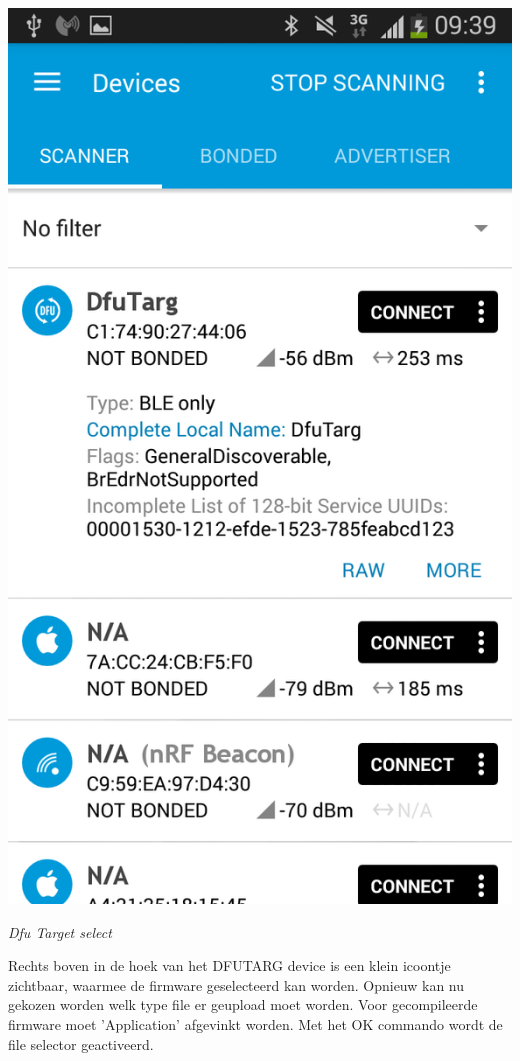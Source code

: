 \documentclass[conference]{IEEEtran}
\begin{document}
\begin{center}
    \includegraphics[scale=0.3]{FOTA4}
    \begin{minipage}{0.6\textwidth}
    \footnotesize
    \emph{Dfu Target select}
    \end{minipage}
\end{center}

Rechts boven in de hoek van het DFUTARG device is een klein icoontje zichtbaar, waarmee de firmware geselecteerd kan worden. Opnieuw kan nu gekozen worden welk type file er geupload moet worden. Voor gecompileerde firmware moet 'Application' afgevinkt worden. Met het OK commando wordt de file selector geactiveerd. 
\end{document}
